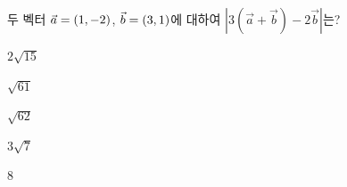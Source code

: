 두 벡터 $\vec{a}=(1{,}\mkern3mu\mathopen{}-2)$, $\vec{b}=(3{,}\mkern3mu\mathopen{}1)$에 대하여 $|3(\vec{a}+\vec{b})-2\vec{b}|$는?
\begin{choices32}{\rule[-3ex]{0pt}{8ex}$2\sqrt{15}$}{\rule[-3ex]{0pt}{8ex}$\sqrt{61}$}{\rule[-3ex]{0pt}{8ex}$\sqrt{62}$}{\rule[-3ex]{0pt}{8ex}$3\sqrt{7}$}{\rule[-3ex]{0pt}{8ex}$8$}\end{choices32}
